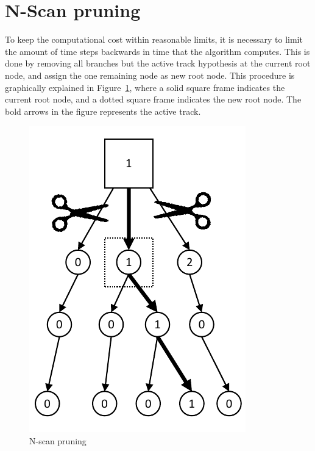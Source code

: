 \section{N-Scan pruning}
To keep the computational cost within reasonable limits, it is necessary to limit the amount of time steps backwards in time that the algorithm computes. This is done by removing all branches but the active track hypothesis at the current root node, and assign the one remaining node as new root node. This procedure is graphically explained in Figure~\ref{fig:pruned_tree}, where a solid square frame indicates the current root node, and a dotted square frame indicates the new root node. The bold arrows in the figure represents the active track.
\begin{figure}
\centering
\includegraphics[scale = .8]{Figures/Pruned-tree.pdf}
\caption{N-scan pruning}\label{fig:pruned_tree}
\end{figure}

